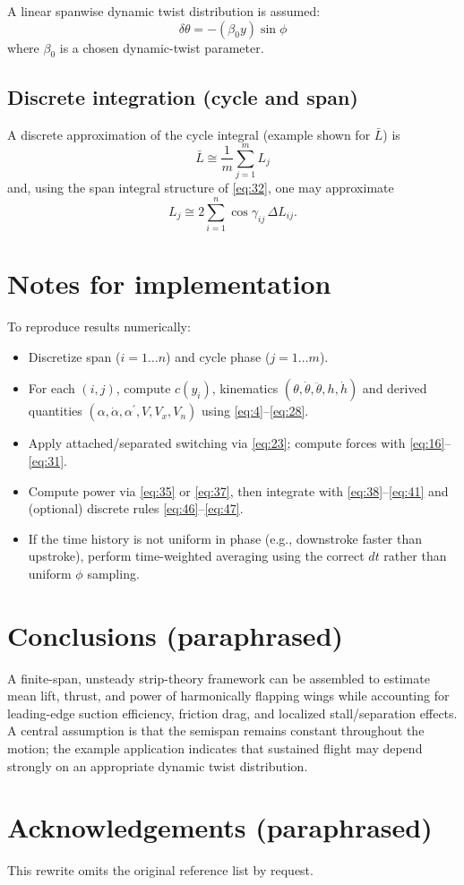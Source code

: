\documentclass[11pt,a4paper]{article}
\begin{document}
A linear spanwise dynamic twist distribution is assumed:
\begin{equation}
\delta\theta=-(\beta_0 y)\sin\phi
\tag{45}\label{eq:45}
\end{equation}
where $\beta_0$ is a chosen dynamic-twist parameter.

\subsection{Discrete integration (cycle and span)}
A discrete approximation of the cycle integral (example shown for $\bar{L}$) is
\begin{equation}
\bar{L}\cong\frac{1}{m}\sum_{j=1}^{m}L_j
\tag{46}\label{eq:46}
\end{equation}
and, using the span integral structure of \eqref{eq:32}, one may approximate
\begin{equation}
L_j\cong 2\sum_{i=1}^{n}\cos\gamma_{ij}\,\Delta L_{ij}.
\tag{47}\label{eq:47}
\end{equation}

\section{Notes for implementation}
To reproduce results numerically:
\begin{itemize}
\item Discretize span ($i=1\ldots n$) and cycle phase ($j=1\ldots m$).
\item For each $(i,j)$, compute $c(y_i)$, kinematics $(\theta,\dot{\theta},\ddot{\theta},h,\dot{h})$ and derived
quantities $(\alpha,\dot{\alpha},\alpha^\prime,V,V_x,V_n)$ using \eqref{eq:4}--\eqref{eq:28}.
\item Apply attached/separated switching via \eqref{eq:23}; compute forces with \eqref{eq:16}--\eqref{eq:31}.
\item Compute power via \eqref{eq:35} or \eqref{eq:37}, then integrate with \eqref{eq:38}--\eqref{eq:41} and
(optional) discrete rules \eqref{eq:46}--\eqref{eq:47}.
\item If the time history is not uniform in phase (e.g., downstroke faster than upstroke), perform time-weighted
averaging using the correct $dt$ rather than uniform $\phi$ sampling.
\end{itemize}

\section{Conclusions (paraphrased)}
A finite-span, unsteady strip-theory framework can be assembled to estimate mean lift, thrust, and power of
harmonically flapping wings while accounting for leading-edge suction efficiency, friction drag, and localized
stall/separation effects. A central assumption is that the semispan remains constant throughout the motion;
the example application indicates that sustained flight may depend strongly on an appropriate dynamic twist distribution.

\section*{Acknowledgements (paraphrased)}
This rewrite omits the original reference list by request.
\end{document}
